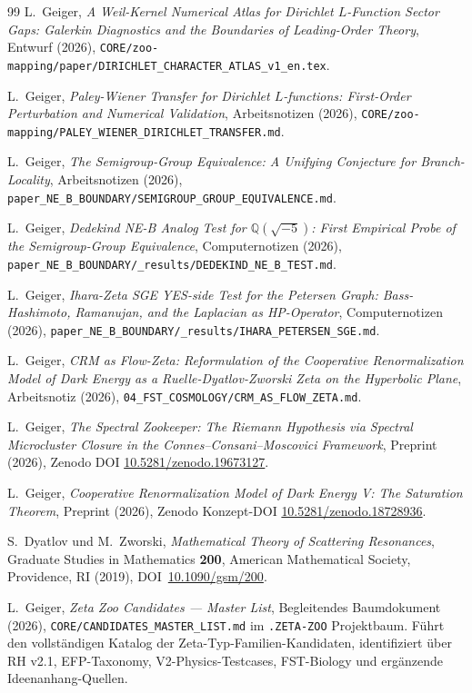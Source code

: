 \documentclass[11pt]{article}
\theoremstyle{definition}
\theoremstyle{remark}
\begin{document}
\begin{thebibliography}{99}
L.~Geiger, \emph{A Weil-Kernel Numerical Atlas for Dirichlet
$L$-Function Sector Gaps: Galerkin Diagnostics and the Boundaries of
Leading-Order Theory}, Entwurf (2026),
\texttt{CORE/zoo-mapping/paper/DIRICHLET\_CHARACTER\_ATLAS\_v1\_en.tex}.

L.~Geiger, \emph{Paley-Wiener Transfer for Dirichlet $L$-functions:
First-Order Perturbation and Numerical Validation}, Arbeitsnotizen
(2026),
\texttt{CORE/zoo-mapping/PALEY\_WIENER\_DIRICHLET\_TRANSFER.md}.

L.~Geiger, \emph{The Semigroup-Group Equivalence: A Unifying
Conjecture for Branch-Locality}, Arbeitsnotizen (2026),
\texttt{paper\_NE\_B\_BOUNDARY/SEMIGROUP\_GROUP\_EQUIVALENCE.md}.

L.~Geiger, \emph{Dedekind NE-B Analog Test for
$\mathbb{Q}(\sqrt{-5})$: First Empirical Probe of the
Semigroup-Group Equivalence}, Computernotizen (2026),
\texttt{paper\_NE\_B\_BOUNDARY/\_results/DEDEKIND\_NE\_B\_TEST.md}.

L.~Geiger, \emph{Ihara-Zeta SGE YES-side Test for the Petersen
Graph: Bass-Hashimoto, Ramanujan, and the Laplacian as HP-Operator},
Computernotizen (2026),
\texttt{paper\_NE\_B\_BOUNDARY/\_results/IHARA\_PETERSEN\_SGE.md}.

L.~Geiger, \emph{CRM as Flow-Zeta: Reformulation of the Cooperative
Renormalization Model of Dark Energy as a Ruelle-Dyatlov-Zworski
Zeta on the Hyperbolic Plane}, Arbeitsnotiz (2026),
\texttt{04\_FST\_COSMOLOGY/CRM\_AS\_FLOW\_ZETA.md}.

L.~Geiger, \emph{The Spectral Zookeeper: The Riemann Hypothesis via
Spectral Microcluster Closure in the Connes--Consani--Moscovici
Framework}, Preprint (2026), Zenodo DOI
\href{https://doi.org/10.5281/zenodo.19673127}{10.5281/zenodo.19673127}.

L.~Geiger, \emph{Cooperative Renormalization Model of Dark Energy V:
The Saturation Theorem}, Preprint (2026), Zenodo Konzept-DOI
\href{https://doi.org/10.5281/zenodo.18728936}{10.5281/zenodo.18728936}.

S.~Dyatlov und M.~Zworski, \emph{Mathematical Theory of Scattering
Resonances}, Graduate Studies in Mathematics \textbf{200}, American
Mathematical Society, Providence, RI (2019),
DOI~\href{https://doi.org/10.1090/gsm/200}{10.1090/gsm/200}.

L.~Geiger, \emph{Zeta Zoo Candidates --- Master List}, Begleitendes
Baumdokument (2026),
\texttt{CORE/CANDIDATES\_MASTER\_LIST.md} im
\texttt{.ZETA-ZOO} Projektbaum. Führt den vollständigen Katalog der Zeta-Typ-Familien-Kandidaten,
identifiziert über RH v2.1, EFP-Taxonomy, V2-Physics-Testcases, FST-Biology und
ergänzende Ideenanhang-Quellen.


\end{thebibliography}
\end{document}
